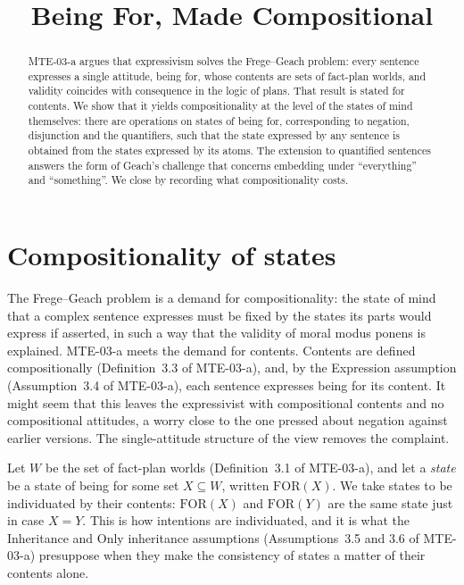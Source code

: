 \documentclass{situationist-preprint}
\title{Being For, Made Compositional}
\begin{document}
\maketitle

\begin{abstract}
MTE-03-a argues that expressivism solves the Frege--Geach problem: every sentence expresses a single attitude, being for, whose contents are sets of fact-plan worlds, and validity coincides with consequence in the logic of plans. That result is stated for contents. We show that it yields compositionality at the level of the states of mind themselves: there are operations on states of being for, corresponding to negation, disjunction and the quantifiers, such that the state expressed by any sentence is obtained from the states expressed by its atoms. The extension to quantified sentences answers the form of Geach's challenge that concerns embedding under \enquote{everything} and \enquote{something}. We close by recording what compositionality costs.
\end{abstract}

\section{Compositionality of states}\label{s:comp}

The Frege--Geach problem \citep{Geach1965} is a demand for compositionality: the state of mind that a complex sentence expresses must be fixed by the states its parts would express if asserted, in such a way that the validity of moral modus ponens is explained. MTE-03-a meets the demand for contents. Contents are defined compositionally (Definition~3.3 of MTE-03-a), and, by the Expression assumption (Assumption~3.4 of MTE-03-a), each sentence expresses being for its content. It might seem that this leaves the expressivist with compositional contents and no compositional attitudes, a worry close to the one \citet{Unwin1999} pressed about negation against earlier versions. The single-attitude structure of the view removes the complaint.

Let $W$ be the set of fact-plan worlds (Definition~3.1 of MTE-03-a), and let a \emph{state} be a state of being for some set $X\subseteq W$, written $\mathrm{FOR}(X)$. We take states to be individuated by their contents: $\mathrm{FOR}(X)$ and $\mathrm{FOR}(Y)$ are the same state just in case $X=Y$. This is how intentions are individuated, and it is what the Inheritance and Only inheritance assumptions (Assumptions~3.5 and 3.6 of MTE-03-a) presuppose when they make the consistency of states a matter of their contents alone.
\end{document}
